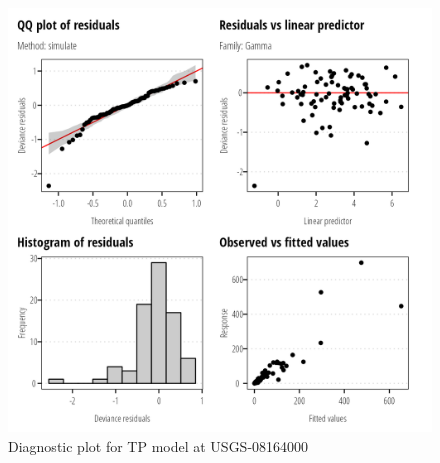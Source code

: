 \documentclass[
]{article}
\begin{document}
\clearpage

\begin{figure}[h]

{\centering \includegraphics{model_assessment_files/figure-pdf/unnamed-chunk-10-1.png}

}

\caption{Diagnostic plot for TP model at USGS-08164000}

\end{figure}
\end{document}
